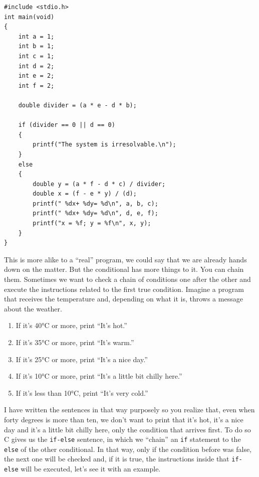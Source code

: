 \documentclass[a4paper]{article}
\newcommand{\centigrade}{°C}
\begin{document}
\noindent
\begin{minipage}[H]{\linewidth}
\mbox{}
\begin{lstlisting}[style=C,
caption={Linear equation resolution program with conditional},
label={lst:linealSystemConditional}]
#include <stdio.h>
int main(void)
{
    int a = 1;
    int b = 1;
    int c = 1;
    int d = 2;
    int e = 2;
    int f = 2;

    double divider = (a * e - d * b);

    if (divider == 0 || d == 0)
    {
        printf("The system is irresolvable.\n");
    }
    else
    {
        double y = (a * f - d * c) / divider;
        double x = (f - e * y) / (d);
        printf(" %dx+ %dy= %d\n", a, b, c);
        printf(" %dx+ %dy= %d\n", d, e, f);
        printf("x = %f; y = %f\n", x, y);
    }
}
\end{lstlisting}
\end{minipage}

This is more alike to a ``real'' program, we could say that we are already
hands down on the matter. But the conditional has more things to it. You can
chain them. Sometimes we want to check a chain of conditions one after the
other and execute the instructions related to the first true condition. Imagine
a program that receives the temperature and, depending on what it is, throws a
message about the weather.
\begin{enumerate}
\item If it's 40\centigrade{} or more, print ``It's hot.''
\item If it's 35\centigrade{} or more, print ``It's warm.''
\item If it's 25\centigrade{} or more, print ``It's a nice day.''
\item If it's 10\centigrade{} or more, print ``It's a little bit chilly here.''
\item If it's less than 10\centigrade{}, print ``It's very cold.''
\end{enumerate}

I have written the sentences in that way purposely so you realize that, even when
forty degrees is more than ten, we don't want to print that it's hot, it's a
nice day and it's a little bit chilly here, only the condition that arrives
first. To do so C gives us the \texttt{if-else} sentence, in which we ``chain''
an \texttt{if} statement to the \texttt{else} of the other conditional. In
that way, only if the condition before was false, the next one will be checked
and, if it is true, the instructions inside that \texttt{if-else} will be
executed, let's see it with an example.
\end{document}
